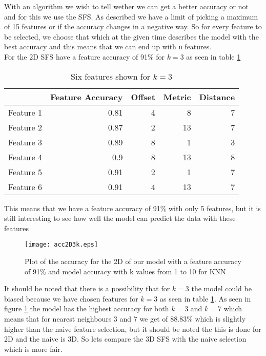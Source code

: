 With an algorithm we wish to tell wether we can get a better accuracy or not and for this we use the SFS. As described we have a limit of picking a maximum of 15 features or if the accuracy changes in a negative way. So for every feature to be selected, we choose that which at the given time describes the model with the best accuracy and this means that we can end up with \texttt{n} features.\\
For the 2D SFS have a feature accuracy of 91\% for $k=3$ as seen in table \ref{tab:Features2d3k}

\begin{table}[htbp]
  \centering
    \begin{tabular}{|r|r|r|r|r|}
    \hline
          & Feature Accuracy & Offset & Metric & Distance \\
    \hline
    Feature 1 & 0.81  & 4     & 8     & 7 \\
    \hline
    Feature 2 & 0.87  & 2     & 13    & 7 \\
    \hline
    Feature 3 & 0.89  & 8     & 1     & 3 \\
    \hline
    Feature 4 & 0.9   & 8     & 13    & 8 \\
    \hline
    Feature 5 & 0.91  & 2     & 1     & 7 \\
    \hline
    Feature 6 & 0.91  & 4     & 13    & 7 \\
    \hline
    \end{tabular}%
    \caption{Six features shown for $k=3$}\label{tab:Features2d3k}%
\end{table}%

This means that we have a feature accuracy of 91\% with only 5 features, but it is still interesting to see how well the model can predict the data with these features

\begin{figure}[H]
  \centering
  \texttt{[image: acc2D3k.eps]}
  \caption{Plot of the accuracy for the 2D of our model with a feature accuracy of 91\% and model accuracy with k values from 1 to 10 for KNN}\label{fig:Features2d3k}
\end{figure}

It should be noted that there is a possibility that for $k=3$ the model could be biased because we have chosen features for $k=3$ as seen in table \ref{tab:Features2d3k}. As seen in figure \ref{fig:Features2d3k} the model has the highest accuracy for both $k=3$ and $k=7$ which means that for nearest neighbours 3 and 7 we get of 88.83\% which is slightly higher than the naive feature selection, but it should be noted the this is done for 2D and the naive is 3D. So lets compare the 3D SFS with the naive selection which is more fair.

